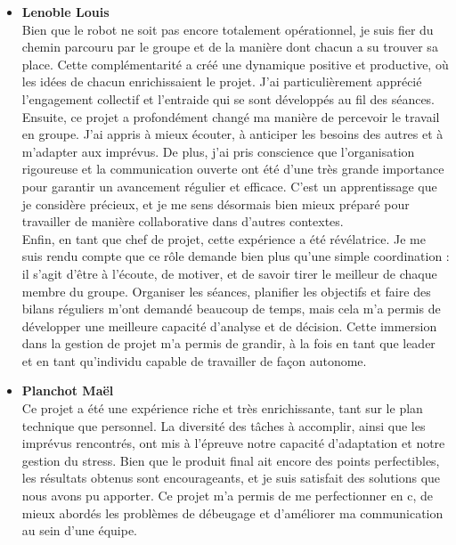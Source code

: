 \begin{itemize}
    \item \textbf{Lenoble Louis}\\Bien que le robot ne soit pas encore totalement opérationnel, je suis fier du chemin parcouru par le groupe et de la manière dont chacun a su trouver sa place. Cette complémentarité a créé une dynamique positive et productive, où les idées de chacun enrichissaient le projet. J’ai particulièrement apprécié l’engagement collectif et l’entraide qui se sont développés au fil des séances.\\

Ensuite, ce projet a profondément changé ma manière de percevoir le travail en groupe. J'ai appris à mieux écouter, à anticiper les besoins des autres et à m'adapter aux imprévus. De plus, j'ai pris conscience que l'organisation rigoureuse et la communication ouverte ont été d'une très grande importance pour garantir un avancement régulier et efficace. C’est un apprentissage que je considère précieux, et je me sens désormais bien mieux préparé pour travailler de manière collaborative dans d'autres contextes.\\

Enfin, en tant que chef de projet, cette expérience a été révélatrice. Je me suis rendu compte que ce rôle demande bien plus qu'une simple coordination : il s'agit d'être à l'écoute, de motiver, et de savoir tirer le meilleur de chaque membre du groupe. Organiser les séances, planifier les objectifs et faire des bilans réguliers m'ont demandé beaucoup de temps, mais cela m’a permis de développer une meilleure capacité d’analyse et de décision. Cette immersion dans la gestion de projet m’a permis de grandir, à la fois en tant que leader et en tant qu’individu capable de travailler de façon autonome.
\end{itemize}
\vspace{5mm}

\begin{itemize}
    \item \textbf{Planchot Maël}\\
Ce projet a été une expérience riche et très enrichissante, tant sur le plan technique que personnel. La diversité des tâches à accomplir, ainsi que les imprévus rencontrés, ont mis à l'épreuve notre capacité d'adaptation et notre gestion du stress. Bien que le produit final ait encore des points perfectibles, les résultats obtenus sont encourageants, et je suis satisfait des solutions que nous avons pu apporter. Ce projet m’a permis de me perfectionner en c, de mieux abordés les problèmes de débeugage et d'améliorer ma communication au sein d'une équipe.
\end{itemize}
\vspace{5mm}

